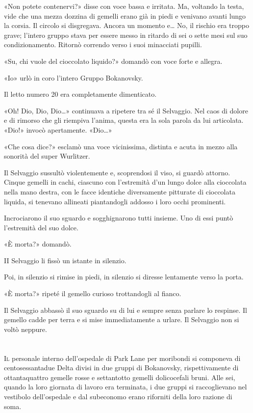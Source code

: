 \documentclass[
a5paper, %
10pt, %
twoside, 
onecolumn, %
openany, %
]{memoir}
\begin{document}
«Non potete contenervi?» disse con voce bassa e irritata. Ma, voltando la testa, vide che una mezza dozzina di gemelli erano già in piedi e venivano avanti lungo la corsia. Il circolo si disgregava. Ancora un momento e… No, il rischio era troppo grave; l’intero gruppo stava per essere messo in ritardo di sei o sette mesi sul suo condizionamento. Ritornò correndo verso i suoi minacciati pupilli.

«Su, chi vuole del cioccolato liquido?» domandò con voce forte e allegra.

«Io» urlò in coro l’intero Gruppo Bokanovsky.

Il letto numero 20 era completamente dimenticato.

«Oh! Dio, Dio, Dio…» continuava a ripetere tra sé il Selvaggio. Nel caos di dolore e di rimorso che gli riempiva l’anima, questa era la sola parola da lui articolata. «Dio!» invocò apertamente. «Dio…»

«Che cosa dice?» esclamò una voce vicinissima, distinta e acuta in mezzo alla sonorità del super Wurlitzer.

Il Selvaggio sussultò violentemente e, scoprendosi il viso, si guardò attorno. Cinque gemelli in cachi, ciascuno con l’estremità d’un lungo dolce alla cioccolata nella mano destra, con le facce identiche diversamente pitturate di cioccolata liquida, si tenevano allineati piantandogli addosso i loro occhi prominenti.

Incrociarono il suo sguardo e sogghignarono tutti insieme. Uno di essi puntò l’estremità del suo dolce.

«È morta?» domandò.

II Selvaggio li fissò un istante in silenzio.

Poi, in silenzio si rimise in piedi, in silenzio si diresse lentamente verso la porta.

«È morta?» ripeté il gemello curioso trottandogli al fianco.

Il Selvaggio abbassò il suo sguardo su di lui e sempre senza parlare lo respinse. Il gemello cadde per terra e si mise immediatamente a urlare. Il Selvaggio non si voltò neppure.

\chapter{\phantom{title}}

\lettrine{I}{l} personale interno dell’ospedale di Park Lane per moribondi si componeva di centosessantadue Delta divisi in due gruppi di Bokanovsky, rispettivamente di ottantaquattro gemelle rosse e settantotto gemelli dolicocefali bruni. Alle sei, quando la loro giornata di lavoro era terminata, i due gruppi si raccoglievano nel vestibolo dell’ospedale e dal subeconomo erano riforniti della loro razione di soma.
\end{document}
